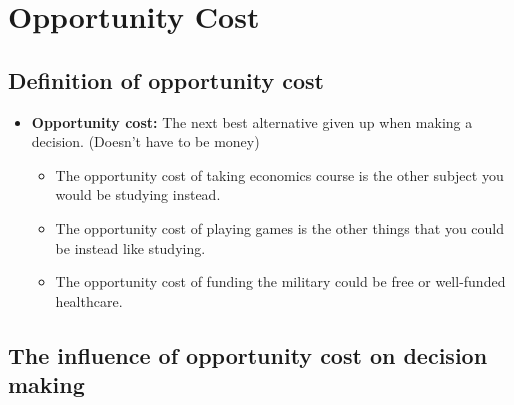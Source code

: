 \documentclass[11pt, a4paper, openany]{book}
\begin{document}
%

\section{Opportunity Cost}

\subsection{Definition of opportunity cost}

\begin{itemize}\itemsep0em
    \item \textbf{Opportunity cost:} The next best alternative given up when making a decision. (Doesn't have to be money)
        \begin{itemize}\itemsep0em
            \item The opportunity cost of taking economics course is the other subject you would be studying instead.
            \item The opportunity cost of playing games is the other things that you could be instead like studying.
            \item The opportunity cost of funding the military could be free or well-funded healthcare.
        \end{itemize}
\end{itemize}

\subsection{The influence of opportunity cost on decision making}
\end{document}

